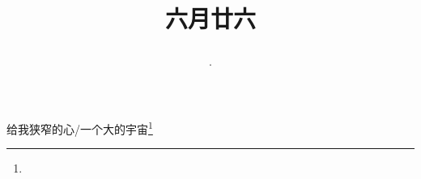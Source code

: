 \title{\date[d=31,m=7,y=2024][year:cn-y,年,month:cn,day:cn,日,·,weekday]·六月廿六 }
给我狭窄的心/一个大的宇宙\footnote{ }

